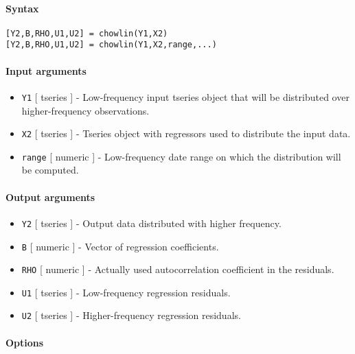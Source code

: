 


	\paragraph{Syntax}\label{syntax}

\begin{verbatim}
[Y2,B,RHO,U1,U2] = chowlin(Y1,X2)
[Y2,B,RHO,U1,U2] = chowlin(Y1,X2,range,...)
\end{verbatim}

\paragraph{Input arguments}\label{input-arguments}

\begin{itemize}
\item
  \texttt{Y1} {[} tseries {]} - Low-frequency input tseries object that
  will be distributed over higher-frequency observations.
\item
  \texttt{X2} {[} tseries {]} - Tseries object with regressors used to
  distribute the input data.
\item
  \texttt{range} {[} numeric {]} - Low-frequency date range on which the
  distribution will be computed.
\end{itemize}

\paragraph{Output arguments}\label{output-arguments}

\begin{itemize}
\item
  \texttt{Y2} {[} tseries {]} - Output data distributed with higher
  frequency.
\item
  \texttt{B} {[} numeric {]} - Vector of regression coefficients.
\item
  \texttt{RHO} {[} numeric {]} - Actually used autocorrelation
  coefficient in the residuals.
\item
  \texttt{U1} {[} tseries {]} - Low-frequency regression residuals.
\item
  \texttt{U2} {[} tseries {]} - Higher-frequency regression residuals.
\end{itemize}

\paragraph{Options}\label{options}

